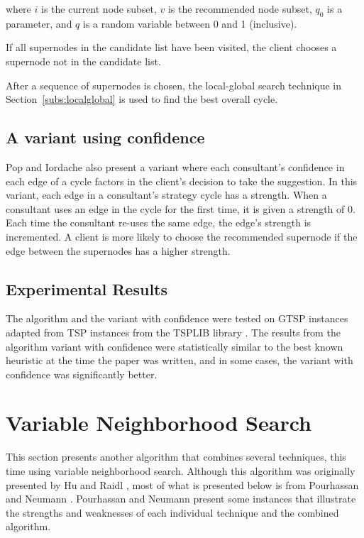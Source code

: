 \documentclass{sig-alternate}
\begin{document}
where $i$ is the current node subset, $v$ is the recommended node subset, $q_{0}$ is a parameter, and $q$ is a random variable between 0 and 1 (inclusive). 

If all supernodes in the candidate list have been visited, the client chooses a supernode not in the candidate list.

After a sequence of supernodes is chosen, the local-global search technique in Section~\ref{subs:localglobal} is used to find the best overall cycle. 

\subsection{A variant using confidence}
Pop and Iordache also present a variant where each consultant's confidence in each edge of a cycle factors in the client's decision to take the suggestion. In this variant, each edge in a consultant's strategy cycle has a strength. When a consultant uses an edge in the cycle for the first time, it is given a strength of 0. Each time the consultant re-uses the same edge, the edge's strength is incremented. A client is more likely to choose the recommended supernode if the edge between the supernodes has a higher strength. 

\subsection{Experimental Results}
\label{subs:popresults}
The algorithm and the variant with confidence were tested on GTSP instances adapted from TSP instances from the TSPLIB library \cite{Reinelt:1991}. The results from the algorithm variant with confidence were statistically similar to the best known heuristic at the time the paper was written, and in some cases, the variant with confidence was significantly better. 

\section{Variable Neighborhood Search}
\label{sec:VNS}
This section presents another algorithm that combines several techniques, this time using variable neighborhood search. Although this algorithm was originally presented by Hu and Raidl \cite{Hu:2008}, most of what is presented below is from Pourhassan and Neumann \cite{Pourhassan:2015}. Pourhassan and Neumann present some instances that illustrate the strengths and weaknesses of each individual technique and the combined algorithm. 
\end{document}
